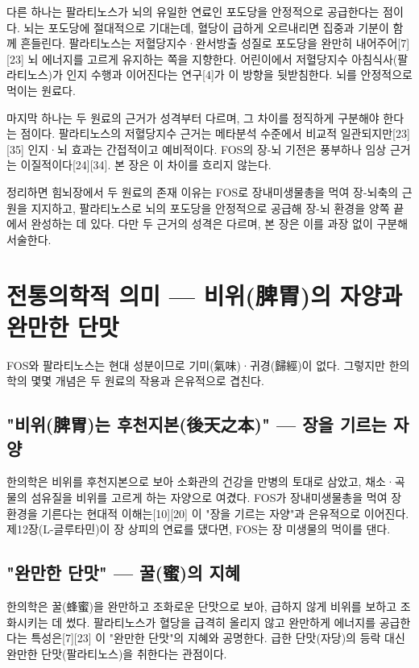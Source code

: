 \documentclass[12pt,oneside]{book}
\begin{document}
다른 하나는 팔라티노스가 뇌의 유일한 연료인 포도당을 안정적으로 공급한다는 점이다. 뇌는 포도당에 절대적으로 기대는데, 혈당이 급하게 오르내리면 집중과 기분이 함께 흔들린다. 팔라티노스는 저혈당지수·완서방출 성질로 포도당을 완만히 내어주어[7][23] 뇌 에너지를 고르게 유지하는 쪽을 지향한다. 어린이에서 저혈당지수 아침식사(팔라티노스)가 인지 수행과 이어진다는 연구[4]가 이 방향을 뒷받침한다. 뇌를 안정적으로 먹이는 원료다.

마지막 하나는 두 원료의 근거가 성격부터 다르며, 그 차이를 정직하게 구분해야 한다는 점이다. 팔라티노스의 저혈당지수 근거는 메타분석 수준에서 비교적 일관되지만[23][35] 인지·뇌 효과는 간접적이고 예비적이다. FOS의 장-뇌 기전은 풍부하나 임상 근거는 이질적이다[24][34]. 본 장은 이 차이를 흐리지 않는다.

정리하면 힘뇌장에서 두 원료의 존재 이유는 FOS로 장내미생물총을 먹여 장-뇌축의 근원을 지지하고, 팔라티노스로 뇌의 포도당을 안정적으로 공급해 장-뇌 환경을 양쪽 끝에서 완성하는 데 있다. 다만 두 근거의 성격은 다르며, 본 장은 이를 과장 없이 구분해 서술한다.

\section{전통의학적 의미 — 비위(脾胃)의 자양과 완만한 단맛}

FOS와 팔라티노스는 현대 성분이므로 기미(氣味)·귀경(歸經)이 없다. 그렇지만 한의학의 몇몇 개념은 두 원료의 작용과 은유적으로 겹친다.

\subsection{"비위(脾胃)는 후천지본(後天之本)" — 장을 기르는 자양}

한의학은 비위를 후천지본으로 보아 소화관의 건강을 만병의 토대로 삼았고, 채소·곡물의 섬유질을 비위를 고르게 하는 자양으로 여겼다. FOS가 장내미생물총을 먹여 장 환경을 기른다는 현대적 이해는[10][20] 이 "장을 기르는 자양"과 은유적으로 이어진다. 제12장(L-글루타민)이 장 상피의 연료를 댔다면, FOS는 장 미생물의 먹이를 댄다.

\subsection{"완만한 단맛" — 꿀(蜜)의 지혜}

한의학은 꿀(蜂蜜)을 완만하고 조화로운 단맛으로 보아, 급하지 않게 비위를 보하고 조화시키는 데 썼다. 팔라티노스가 혈당을 급격히 올리지 않고 완만하게 에너지를 공급한다는 특성은[7][23] 이 "완만한 단맛"의 지혜와 공명한다. 급한 단맛(자당)의 등락 대신 완만한 단맛(팔라티노스)을 취한다는 관점이다.
\end{document}
